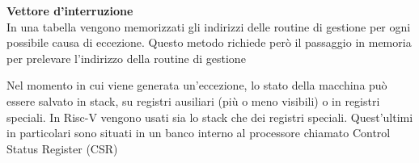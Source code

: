 \documentclass[12pt, a4paper]{article}
\begin{document}
\textbf{Vettore d'interruzione}\\In una tabella vengono memorizzati gli indirizzi delle routine di gestione per ogni
possibile causa di eccezione. Questo metodo richiede però il passaggio in memoria per prelevare l'indirizzo della 
routine di gestione

Nel momento in cui viene generata un'eccezione, lo stato della macchina può essere salvato in stack, su registri 
ausiliari (più o meno visibili) o in registri speciali. In Risc-V vengono usati sia lo stack che dei registri 
speciali. Quest'ultimi in particolari sono situati in un banco interno al processore chiamato Control Status Register
(CSR)
\end{document}
